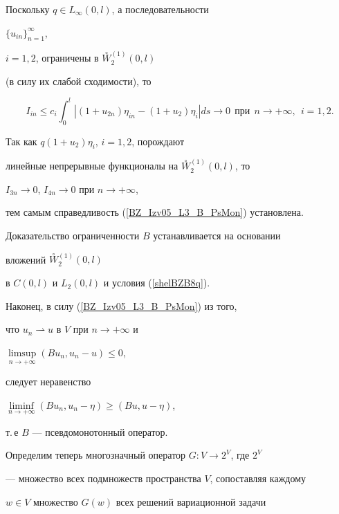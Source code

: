 \begin{pf}
Поскольку $q \in L_{\infty}(0, l)$, а последовательности


$\{{u_{in}}\}_{n=1}^{\infty}$,


$i=1, 2$, ограничены в $\overset{\circ}{W}{}^{(1)}_2 (0, l)$


(в силу их слабой сходимости), то


$$


I_{in} \leq c_i \int_{0}^{l}|(1+ {u_{2n}}) \eta_{in} -


(1+ {u_{2}}) \eta_{i} | ds \to 0 \ \ \text{при}\ \ n \to+\infty,\ \ i=1, 2.


$$





Так как $q(1+ {u_{2}}) \eta_{i}$, $i=1, 2$, порождают


линейные непрерывные функционалы на $\overset{\circ}{W}{}^{(1)}_2 (0,l)$, то


$I_{3n} \to 0$, $I_{4n} \to 0$ при $n \to+\infty$,


тем самым справедливость (\ref{BZ_Izv05_L3_B_PsMon}) установлена.





Доказательство ограниченности $B$ устанавливается на основании


вложений $\overset{\circ}{W}{}^{(1)}_2 (0, l)$


в $C(0,l)$ и $L_2(0,l)$ и условия (\ref{shelBZB8q}).





Наконец, в силу (\ref{BZ_Izv05_L3_B_PsMon}) из того,


что $u_n \rightharpoonup u$ в $V$ при $n \to+\infty$ и


$\limsup\limits_{n \rightarrow+\infty}(Bu_n,u_n-u) \leq 0$,


следует неравенство


$\liminf\limits_{n \rightarrow+\infty}(Bu_n,u_n-\eta) \geq (Bu,u-\eta)$,


т.\,е $B$ --- псевдомонотонный оператор.


\end{pf}





Определим теперь многозначный оператор $G : V \rightarrow 2^V$, где $2^V$


--- множество всех подмножеств пространства $V$, сопоставляя каждому


$w \in V$ множество $G(w)$ всех решений вариационной задачи


